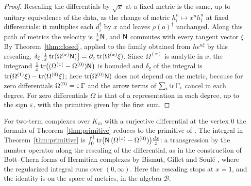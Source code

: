 \begin{proof}
Rescaling the differentials by $\sqrt x$ at a fixed metric is the same, up
to unitary equivalence of the data, as the change of metric
$h_i^n\mapsto x^nh_i^n$ at fixed differentials: it multiplies each
$d_i^\dagger$ by $x$ and leaves $\rho(a)^\dagger$ unchanged. Along this path
of metrics the velocity is $\frac1x\mathsf N$, and $\mathsf N$ commutes with every
tangent vector $\xi$. By Theorem~\ref{thm:closed}, applied to the family
obtained from $he^{u\xi}$ by this rescaling,
$\delta_\xi\bigl[\frac1x\operatorname{tr}(\Omega^{(x)}\mathsf N)\bigr]=\partial_x\operatorname{tr}(\Omega^{(x)}\xi)$.
Since $\Omega^{(x)}$ is analytic in $x$, the integrand
$\frac1x\operatorname{tr}\bigl((\Omega^{(x)}-\Omega^{(0)})\mathsf N\bigr)$ is bounded and
$\delta_\xi$ of the integral is $\operatorname{tr}(\Omega^{(1)}\xi)-\operatorname{tr}(\Omega^{(0)}\xi)$;
here $\operatorname{tr}(\Omega^{(0)}\mathsf N)$ does not depend on the metric, because for zero
differentials $\Omega^{(0)}=\varepsilon\,\Gamma$ and the arrow terms of
$\sum_i\operatorname{tr}\Gamma_i$ cancel in each degree. For zero differentials
$\Omega$ is that of a representation in each degree, up to the sign $\varepsilon$,
with the primitive given by the first sum.
\end{proof}

For two-term complexes over $K_m$ with a surjective differential at the
vertex $0$ the formula of Theorem~\ref{thm:primitive} reduces to the
primitive of \cite[Proposition~7.1]{wue26a}. The integral in
Theorem~\ref{thm:primitive} is $\int_0^1\operatorname{tr}\bigl(\mathsf N\,(\Omega^{(x)}-\Omega^{(0)})\bigr)\frac{dx}x$:
a transgression by the number operator along the rescaling of the
differential, as in the construction of Bott--Chern forms of Hermitian
complexes by Bismut, Gillet and Soul\'e \cite{bgs88}, where the regularized
integral runs over $(0,\infty)$. Here the rescaling stops at $x=1$, and the
identity is on the space of metrics, in the algebra $\mathcal B$.
